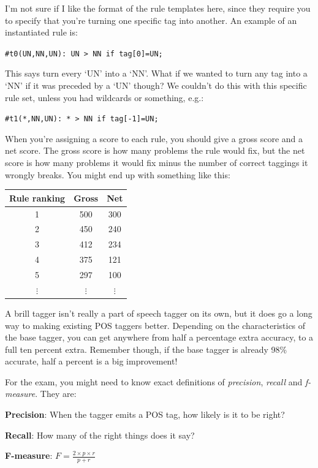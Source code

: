 \begin{description}
  I'm not sure if I like the format of the rule templates here, since they
  require you to specify that you're turning one specific tag into another. An
  example of an instantiated rule is:

  \texttt{\#t0(UN,NN,UN): UN > NN if tag[0]=UN;}

  This says turn every `UN' into a `NN'. What if we wanted to turn any tag into
  a `NN' if it was preceded by a `UN' though? We couldn't do this with this
  specific rule set, unless you had wildcards or something, e.g.:

  \texttt{\#t1(*,NN,UN): * > NN if tag[-1]=UN;}

  When you're assigning a score to each rule, you should give a gross score and
  a net score. The gross score is how many problems the rule would fix, but the
  net score is how many problems it would fix minus the number of correct
  taggings it wrongly breaks. You might end up with something like this:

  \begin{center}
    \begin{tabular} {|c|c|c|}
      \hline
      Rule ranking & Gross & Net\\ \hline
      1 & 500 & 300\\ \hline
      2 & 450 & 240\\ \hline
      3 & 412 & 234\\ \hline
      4 & 375 & 121\\ \hline
      5 & 297 & 100\\ \hline
      $\vdots$ & $\vdots$ & $\vdots$\\ 
    \end{tabular}
  \end{center}

  A brill tagger isn't really a part of speech tagger on its own, but it does go
  a long way to making existing POS taggers better. Depending on the
  characteristics of the base tagger, you can get anywhere from half a
  percentage extra accuracy, to a full ten percent extra. Remember though, if
  the base tagger is already 98\% accurate, half a percent is a big improvement!
\end{description}

For the exam, you might need to know exact definitions of \textit{precision},
\textit{recall} and \textit{f-measure}. They are:

\begin{description}
	\item \textbf{Precision}: When the tagger emits a POS tag, how likely is it
	to be right?
	\item \textbf{Recall}: How many of the right things does it say?
	\item \textbf{F-measure}: $F = \frac{2 \times p \times r}{p + r}$
\end{description}

